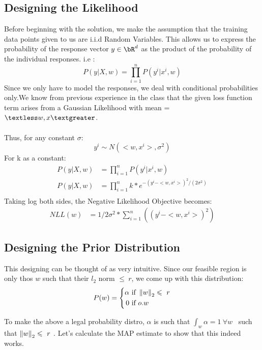 \documentclass[a4paper,11pt]{article}
\begin{document}
\begin{mlsolution}
\subsection*{Designing the Likelihood}
Before beginning with the solution, we make the assumption that the training data points given to us are i.i.d Random Variables. This allows us to express the probability of the response vector $ y \in \bR^d$ as the product of the probability of the individual responses. i.e : 
\begin{equation}
    P(y|X,w) =  \prod_{i=1}^{n} P(y^i|x^i,w)
\end{equation}
Since we only have to model the responses, we deal with conditional probabilities only.We know from previous experience in the class that the given loss function term arises from a Gaussian Likelihood with mean = $\textless w,x \textgreater$. \\
\\
Thus, for any constant $\sigma$:
\begin{equation}
y^i \sim N(<w,x^i>,\sigma ^2)  
\end{equation}
For k as a constant:
\begin{align}
    P(y|X,w) &=  \prod_{i=1}^{n} P(y^i|x^i,w)\\
    P(y|X,w) &=  \prod_{i=1}^{n} k * e^{-(y^i - <w,x^i>)^2/(2\sigma^2)}\\
\end{align}
Taking log both sides, the Negative Likelihood Objective becomes:
\begin{align}
    NLL(w) &=  1/2\sigma^2 * \sum_{i=1}^{n}((y^i - <w,x^i>)^2)
\end{align}
\subsection*{Designing the Prior Distribution}
This designing can be thought of as very intuitive. Since our feasible region is only thos $w$ such that their $l_{2}$ norm $\leqslant \ r$, we come up with this distribution: \\
\abovedisplayskip=0pt\relax
\[
 P(w) =
\left\{
\!
\begin{aligned}
\alpha & \text{ if } \left\| {w} \right\|_{2} \leqslant \ r\\
0 & \text{ if } o.w\\
\end{aligned}
\right.
\]

To make the above a legal probability distro, $\alpha$ is such that $\int_{w}\alpha = 1 \ \forall w$ \ such that $\left\| {w} \right\|_{2} \leqslant \ r$ . Let's calculate the MAP estimate to show that this indeed works.

\end{mlsolution}
\end{document}
